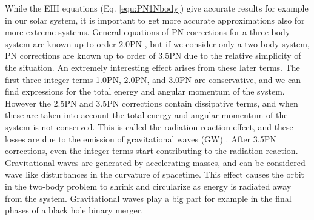 \documentclass[english, oneside]{HYgradu}
\begin{document}
While the EIH equations (Eq. \ref{equ:PN1Nbody}) give accurate results for example in our solar system, it is important to get more accurate approximations also for more extreme systems. General equations of PN corrections for a three-body system are known up to order 2.0PN \citep{gravity}, but if we consider only a two-body system, PN corrections are known up to order of 3.5PN due to the relative simplicity of the situation. An extremely interesting effect arises from these later terms. The first three integer terms 1.0PN, 2.0PN, and 3.0PN are conservative, and we can find expressions for the total energy and angular momentum of the system. However the 2.5PN and 3.5PN corrections contain dissipative terms, and when these are taken into account the total energy and angular momentum of the system is not conserved. This is called the radiation reaction effect, and these losses are due to the emission of gravitational waves (GW) \citep{gravwaves}. After 3.5PN corrections, even the integer terms start contributing to the radiation reaction. Gravitational waves are generated by accelerating masses, and can be considered wave like disturbances in the curvature of spacetime. This effect causes the orbit in the two-body problem to shrink and circularize as energy is radiated away from the system. Gravitational waves play a big part for example in the final phases of a black hole binary merger.
\end{document}
